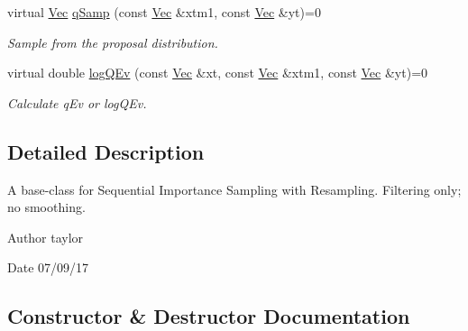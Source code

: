 \begin{DoxyCompactItemize}
virtual \hyperlink{apf__filter_8h_a4c7df05c6f5e8a0d15ae14bcdbc07152}{Vec} \hyperlink{classSISRFilter_a2c480a10cac8b52a36ab1309cf9ea1a4}{q\+Samp} (const \hyperlink{apf__filter_8h_a4c7df05c6f5e8a0d15ae14bcdbc07152}{Vec} \&xtm1, const \hyperlink{apf__filter_8h_a4c7df05c6f5e8a0d15ae14bcdbc07152}{Vec} \&yt)=0
\begin{DoxyCompactList}\small\item\em Sample from the proposal distribution. \end{DoxyCompactList}\item 
virtual double \hyperlink{classSISRFilter_af289db59b008a0ab795fc3b8e9887043}{log\+Q\+Ev} (const \hyperlink{apf__filter_8h_a4c7df05c6f5e8a0d15ae14bcdbc07152}{Vec} \&xt, const \hyperlink{apf__filter_8h_a4c7df05c6f5e8a0d15ae14bcdbc07152}{Vec} \&xtm1, const \hyperlink{apf__filter_8h_a4c7df05c6f5e8a0d15ae14bcdbc07152}{Vec} \&yt)=0
\begin{DoxyCompactList}\small\item\em Calculate q\+Ev or log\+Q\+Ev. \end{DoxyCompactList}\end{DoxyCompactItemize}


\subsection{Detailed Description}
A base-\/class for Sequential Importance Sampling with Resampling. Filtering only; no smoothing. 

\begin{DoxyAuthor}{Author}
taylor 
\end{DoxyAuthor}
\begin{DoxyDate}{Date}
07/09/17 
\end{DoxyDate}


\subsection{Constructor \& Destructor Documentation}

